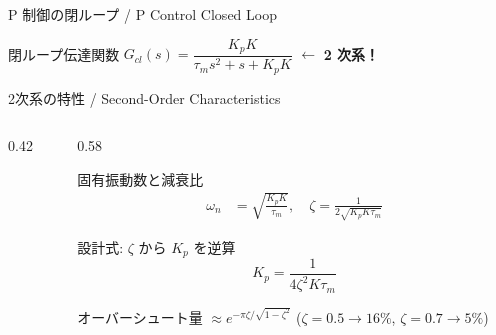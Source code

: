 \begin{frame}{P 制御の閉ループ / P Control Closed Loop}
  \begin{center}
    \vspace{-2mm}
    \resizebox{0.85\textwidth}{!}{}
  \end{center}

  \vspace{-0.5em}

  \begin{block}{閉ループ伝達関数}
    $G_{cl}(s) = \dfrac{K_p K}{\tau_m s^2 + s + K_p K}$
    \hfill $\longleftarrow$ \textbf{2 次系！}
  \end{block}
\end{frame}

\begin{frame}{2次系の特性 / Second-Order Characteristics}
  \vspace{-2mm}
  \begin{columns}[c]
    \begin{column}{0.42\textwidth}
      \centering
      \resizebox{\columnwidth}{!}{}
    \end{column}
    \begin{column}{0.58\textwidth}
      \begin{block}{固有振動数と減衰比}
        \vspace{-0.5em}
        \begin{align*}
          \omega_n &= \sqrt{\frac{K_p K}{\tau_m}}, \quad
          \zeta = \frac{1}{2\sqrt{K_p K \tau_m}}
        \end{align*}
        \vspace{-0.8em}
      \end{block}

      \vspace{0.2em}

      \begin{block}{設計式: $\zeta$ から $K_p$ を逆算}
        \vspace{-0.3em}
        \[
          K_p = \frac{1}{4\zeta^2 K \tau_m}
        \]
        \vspace{-0.7em}
      \end{block}

      \vspace{0.2em}

      {\small オーバーシュート量
      $\approx e^{-\pi\zeta/\sqrt{1-\zeta^2}}$
      \quad ($\zeta\!=\!0.5 \to 16\%$,\; $\zeta\!=\!0.7 \to 5\%$)}
    \end{column}
  \end{columns}
\end{frame}

